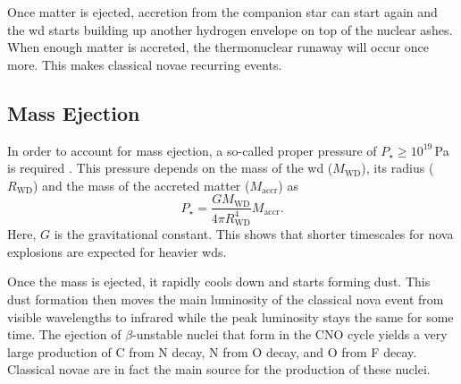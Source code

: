 Once matter is ejected, accretion from the companion star can start again and the \ac{wd} starts building up another hydrogen envelope on top of the nuclear ashes. When enough matter is accreted, the thermonuclear runaway will occur once more. This makes classical novae recurring events.
\begin{table}[tb]
\end{table}

\subsection{Mass Ejection}

In order to account for mass ejection, a so-called proper pressure of $P_\star \geq 10^{19}$\,Pa is required \citep{jose12}. This pressure depends on the mass of the \ac{wd} ($M_\mathrm{WD}$), its radius ($R_\mathrm{WD}$) and the mass of the accreted matter ($M_\mathrm{accr}$) as
\begin{equation}
    P_\star = \frac{GM_\mathrm{WD}}{4\pi R_\mathrm{WD}^4} M_\mathrm{accr}.
\end{equation}
Here, $G$ is the gravitational constant. This shows that shorter timescales for nova explosions are expected for heavier \acp{wd}. 

Once the mass is ejected, it rapidly cools down and starts forming dust. This dust formation then moves the main luminosity of the classical nova event from visible wavelengths to infrared while the peak luminosity stays the same for some time. The ejection of $\beta$-unstable nuclei that form in the CNO cycle yields a very large production of C from N decay, N from O decay, and O from F decay. Classical novae are in fact the main source for the production of these nuclei.



